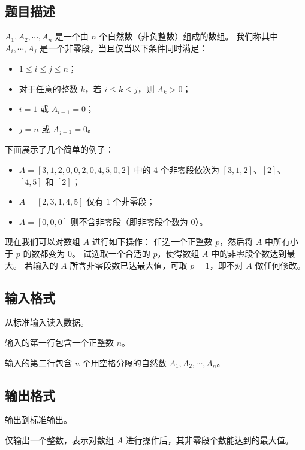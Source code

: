 \subsection*{题目描述}

$A_1, A_2, \cdots, A_n$ 是一个由 $n$ 个自然数（非负整数）组成的数组。
我们称其中 $A_i, \cdots, A_j$ 是一个非零段，当且仅当以下条件同时满足：

\begin{itemize}
    \item $1 \le i \le j \le n$；
    \item 对于任意的整数 $k$，若 $i \le k \le j$，则 $A_k > 0$；
    \item $i = 1$ 或 $A_{i-1} = 0$；
    \item $j = n$ 或 $A_{j+1} = 0$。
\end{itemize}

下面展示了几个简单的例子：

\begin{itemize}
    \item $A = [3, 1, 2, 0, 0, 2, 0, 4, 5, 0, 2]$ 中的 $4$ 个非零段依次为 $[3, 1, 2]$、$[2]$、$[4, 5]$ 和 $[2]$；
    \item $A = [2, 3, 1, 4, 5]$ 仅有 $1$ 个非零段；
    \item $A = [0, 0, 0]$ 则不含非零段（即非零段个数为 $0$）。
\end{itemize}

现在我们可以对数组 $A$ 进行如下操作：
任选一个正整数 $p$，然后将 $A$ 中所有小于 $p$ 的数都变为 $0$。
试选取一个合适的 $p$，使得数组 $A$ 中的非零段个数达到最大。
若输入的 $A$ 所含非零段数已达最大值，可取 $p=1$，即不对 $A$ 做任何修改。

\subsection*{输入格式}

从标准输入读入数据。

输入的第一行包含一个正整数 $n$。

输入的第二行包含 $n$ 个用空格分隔的自然数 $A_1, A_2, \cdots, A_n$。

\subsection*{输出格式}

输出到标准输出。

仅输出一个整数，表示对数组 $A$ 进行操作后，其非零段个数能达到的最大值。

\examplebox*{}{}

